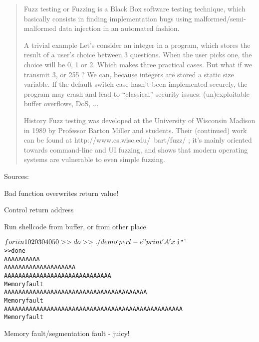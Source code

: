 \documentclass[Screen16to9,17pt]{foils}
\begin{document}
\begin{quote}
Fuzz testing or Fuzzing is a Black Box software testing technique, which basically consists in finding implementation bugs using malformed/semi-malformed data injection in an automated fashion.

A trivial example
Let’s consider an integer in a program, which stores the result of a user’s choice between 3 questions. When the user picks one, the choice will be 0, 1 or 2. Which makes three practical cases. But what if we transmit 3, or 255 ? We can, because integers are stored a static size variable. If the default switch case hasn’t been implemented securely, the program may crash and lead to “classical” security issues: (un)exploitable buffer overflows, DoS, ...

History
Fuzz testing was developed at the University of Wisconsin Madison in 1989 by Professor Barton Miller and students. Their (continued) work can be found at http://www.cs.wisc.edu/~bart/fuzz/ ; it’s mainly oriented towards command-line and UI fuzzing, and shows that modern operating systems are vulnerable to even simple fuzzing.
\end{quote}
Sources:  \\





\begin{list2}
\item Bad function overwrites return value!
\item Control return address
\item Run shellcode from buffer, or from other place
\end{list2}


\begin{alltt}
$ for i in 10 20 30 40 50
>> do
>> ./demo `perl -e "print 'A'x$i"`
>> done
AAAAAAAAAA
AAAAAAAAAAAAAAAAAAAA
AAAAAAAAAAAAAAAAAAAAAAAAAAAAAA
Memory fault
AAAAAAAAAAAAAAAAAAAAAAAAAAAAAAAAAAAAAAAA
Memory fault
AAAAAAAAAAAAAAAAAAAAAAAAAAAAAAAAAAAAAAAAAAAAAAAAAA
Memory fault
\end{alltt}

\centerline{Memory fault/segmentation fault - juicy!}

\end{document}
